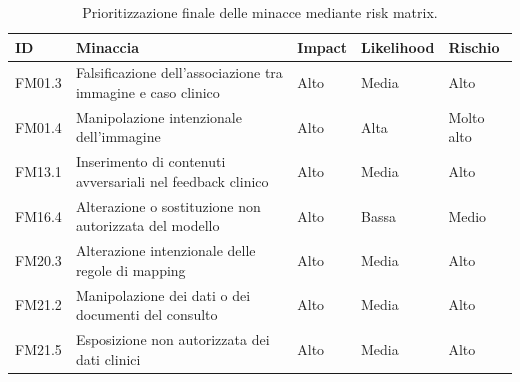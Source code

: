 \begin{table}[htbp]
    \centering
    \small
    \setlength{\tabcolsep}{5pt}
    \renewcommand{\arraystretch}{1.1}

    \begin{tabularx}{\textwidth}{
        >{\raggedright\arraybackslash}p{1.2cm}
        X
        >{\centering\arraybackslash}p{1.7cm}
        >{\centering\arraybackslash}p{1.8cm}
        >{\centering\arraybackslash}p{1.8cm}
    }

        \toprule

        \textbf{ID} &
        \textbf{Minaccia} &
        \textbf{Impact} &
        \textbf{Likelihood} &
        \textbf{Rischio} \\

        \midrule

        FM01.3 &
        Falsificazione dell'associazione tra immagine e caso clinico &
        Alto &
        Media &
        Alto \\

        \midrule

        FM01.4 &
        Manipolazione intenzionale dell'immagine &
        Alto &
        Alta &
        Molto alto \\

        \midrule

        FM13.1 &
        Inserimento di contenuti avversariali nel feedback clinico &
        Alto &
        Media &
        Alto \\

        \midrule

        FM16.4 &
        Alterazione o sostituzione non autorizzata del modello &
        Alto &
        Bassa &
        Medio \\

        \midrule

        FM20.3 &
        Alterazione intenzionale delle regole di mapping &
        Alto &
        Media &
        Alto \\

        \midrule

        FM21.2 &
        Manipolazione dei dati o dei documenti del consulto &
        Alto &
        Media &
        Alto \\

        \midrule

        FM21.5 &
        Esposizione non autorizzata dei dati clinici &
        Alto &
        Media &
        Alto \\

        \bottomrule

    \end{tabularx}

    \caption{Prioritizzazione finale delle minacce mediante risk matrix.}
    \label{tab:final-risk-prioritization}
\end{table}


